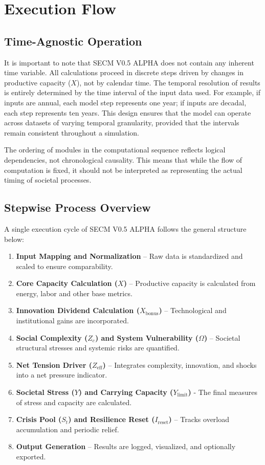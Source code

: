 \documentclass[12pt,a4paper]{article}
\begin{document}
\section{Execution Flow}

\subsection{Time-Agnostic Operation}
It is important to note that SECM V0.5 ALPHA does not contain any inherent time variable. All calculations proceed in discrete steps driven by changes in productive capacity (\(X\)), not by calendar time. The temporal resolution of results is entirely determined by the time interval of the input data used. For example, if inputs are annual, each model step represents one year; if inputs are decadal, each step represents ten years. This design ensures that the model can operate across datasets of varying temporal granularity, provided that the intervals remain consistent throughout a simulation.

The ordering of modules in the computational sequence reflects logical dependencies, not chronological causality. This means that while the flow of computation is fixed, it should not be interpreted as representing the actual timing of societal processes.

\subsection{Stepwise Process Overview}
A single execution cycle of SECM V0.5 ALPHA follows the general structure below:
\begin{enumerate}
    \item \textbf{Input Mapping and Normalization} – Raw data is standardized and scaled to ensure comparability.
    \item \textbf{Core Capacity Calculation (\(X\))} – Productive capacity is calculated from energy, labor and other base metrics.
    \item \textbf{Innovation Dividend Calculation (\(X_{\text{bonus}}\))} – Technological and institutional gains are incorporated.
    \item \textbf{Social Complexity (\(Z_c\)) and System Vulnerability (\(\Omega\))} – Societal structural stresses and systemic risks are quantified.
    \item \textbf{Net Tension Driver (\(Z_{\mathrm{eff}}\))} – Integrates complexity, innovation, and shocks into a net pressure indicator.
    \item \textbf{Societal Stress (\(Y\)) and Carrying Capacity (\(Y_{\mathrm{limit}}\))} - The final measures of stress and capacity are calculated.
    \item \textbf{Crisis Pool (\(S_t\)) and Resilience Reset (\(I_{\mathrm{reset}}\))} – Tracks overload accumulation and periodic relief.
    \item \textbf{Output Generation} – Results are logged, visualized, and optionally exported.
\end{enumerate}
\end{document}
